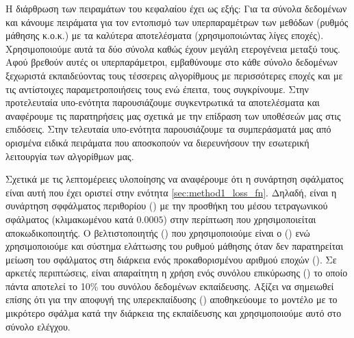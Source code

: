 Η διάρθρωση των πειραμάτων του κεφαλαίου έχει ως εξής: Για τα σύνολα δεδομένων  και  κάνουμε πειράματα για τον εντοπισμό των υπερπαραμέτρων των μεθόδων (ρυθμός μάθησης κ.ο.κ.) με τα καλύτερα αποτελέσματα (χρησιμοποιώντας λίγες εποχές). Χρησιμοποιούμε αυτά τα δύο σύνολα καθώς έχουν μεγάλη ετερογένεια μεταξύ τους. Αφού βρεθούν αυτές οι υπερπαράμετροι, εμβαθύνουμε στο κάθε σύνολο δεδομένων ξεχωριστά εκπαιδεύοντας τους τέσσερεις αλγορίθμους με περισσότερες εποχές και με τις αντίστοιχες παραμετροποιήσεις τους ενώ έπειτα, τους συγκρίνουμε. Στην προ\textendash τελευταία υπο-ενότητα παρουσιάζουμε συγκεντρωτικά τα αποτελέσματα και αναφέρουμε τις παρατηρήσεις μας σχετικά με την επίδραση των υποθέσεών μας στις επιδόσεις. Στην τελευταία υπο-ενότητα παρουσιάζουμε τα συμπεράσματά μας από ορισμένα ειδικά πειράματα που αποσκοπούν να διερευνήσουν την εσωτερική λειτουργία των αλγορίθμων μας.\par

Σχετικά με τις λεπτομέρειες υλοποίησης να αναφέρουμε ότι η συνάρτηση σφάλματος είναι αυτή που έχει οριστεί στην ενότητα \ref{sec:method1_loss_fn}. Δηλαδή, είναι η συνάρτηση σφφάλματος περιθορίου () με την προσθήκη του μέσου τετραγωνικού σφάλματος (κλιμακωμένου κατά $0.0005$) στην περίπτωση που χρησιμοποιείται αποκωδικοποιητής. Ο βελτιστοποιητής () που χρησιμοποιούμε είναι ο  () ενώ χρησιμοποιούμε και σύστημα ελάττωσης του ρυθμού μάθησης όταν δεν παρατηρείται μείωση του σφάλματος στη διάρκεια ενός προκαθορισμένου αριθμού εποχών (). Σε αρκετές περιπτώσεις, είναι απαραίτητη η χρήση ενός συνόλου επικύρωσης () το οποίο πάντα αποτελεί το 10\% του συνόλου δεδομένων εκπαίδευσης. Αξίζει να σημειωθεί επίσης ότι για την αποφυγή της υπερεκπαίδυσης () αποθηκεύουμε το μοντέλο με το μικρότερο σφάλμα κατά την διάρκεια της εκπαίδευσης και χρησιμοποιούμε αυτό στο σύνολο ελέγχου.\par

